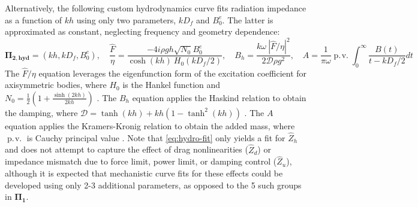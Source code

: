 Alternatively, the following custom hydrodynamics curve fits radiation impedance as a function of $kh$ using only two parameters, $kD_f$ and $B_0^e$.
The latter is approximated as constant, neglecting frequency and geometry dependence:
\begin{equation}\label{eq:hydro-fit}
    \mathbf{\Pi_{2,hyd}} = (kh, kD_f, B_0^e),
    \quad
    \frac{\hat{F}}{\eta} = \frac{-4i\rho g h \sqrt{N_0}B_0^e}{\cosh(kh)~H_0(kD_f/2)},
    \quad
    B_h = \frac{k \omega~ |\hat{F}/\eta|^2}{2 \mathcal{D} \rho g^2},
    \quad
    A = \frac{1}{\pi \omega} \displaystyle \operatorname {p.\!v.}\int_0^\infty \frac{B(t)}{t-kD_f/2} dt
\end{equation}
The $\hat{F}/\eta$ equation leverages the eigenfunction form of the excitation coefficient for axisymmetric bodies, where $H_0$ is the Hankel function and $N_0=\frac{1}{2}\left(1+\frac{\sinh(2kh)}{2kh}  \right)$ \cite{chau_inertia_2012}.
The $B_h$ equation applies the Haskind relation to obtain the damping, where $\mathcal{D}=\tanh(kh)+kh(1-\tanh^2(kh))$ \cite{chau_inertia_2012}.
The $A$ equation applies the Kramers-Kronig relation to obtain the added mass, where $\operatorname {p.\!v.}$ is Cauchy principal value \cite{greenhow_added_1988}.
Note that \eqref{eq:hydro-fit} only yields a fit for $\hat{Z}_h$ and does not attempt to capture the effect of drag nonlinearities ($\hat{Z}_d$) or impedance mismatch due to force limit, power limit, or damping control ($\hat{Z}_u$), although it is expected that mechanistic curve fits for these effects could be developed using only 2-3 additional parameters, as opposed to the 5 such groups in $\mathbf{\Pi_1}$.

